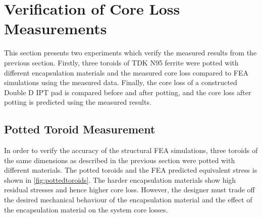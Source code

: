 \documentclass[conference]{IEEEtran}
\begin{document}
\section{Verification of Core Loss Measurements}
\label{sec:simulation}

This section presents two experiments which verify the measured results from the previous section. 
Firstly, three toroids of TDK N95 ferrite were potted with different encapsulation materials and the measured core loss compared to FEA simulations using the measured data. 
Finally, the core loss of a constructed Double D IPT pad is compared before and after potting, and the core loss after potting is predicted using the measured results. 

\subsection{Potted Toroid Measurement}

In order to verify the accuracy of the structural FEA simulations, three toroids of the same dimensions as described in the previous section were potted with different materials.
The potted toroids and the FEA predicted equivalent stress is shown in \cref{fig:pottedtoroids}.
The harder encapsulation materials show high residual stresses and hence higher core loss. 
However, the designer must trade off the desired mechanical behaviour of the encapsulation material and the effect of the encapsulation material on the system core losses. 
\end{document}
